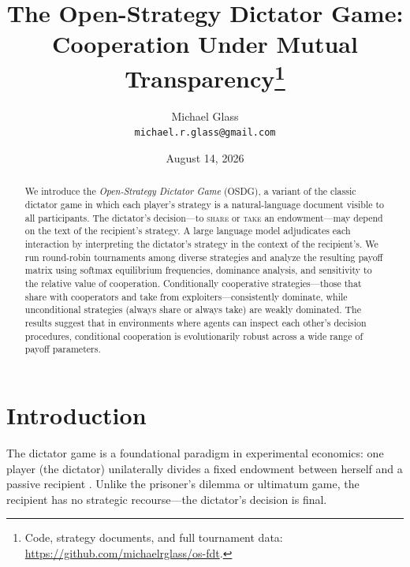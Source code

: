 \documentclass[11pt]{article}
\title{The Open-Strategy Dictator Game:\\
  Cooperation Under Mutual Transparency\thanks{Code, strategy
  documents, and full tournament data:
  \url{https://github.com/michaelrglass/os-fdt}.}}
\author{
  Michael Glass \\
  \texttt{michael.r.glass@gmail.com}
}
\date{August 14, 2026}
\begin{document}
\maketitle

\begin{abstract}
We introduce the \emph{Open-Strategy Dictator Game} (OSDG), a variant of the
classic dictator game in which each player's strategy is a natural-language
document visible to all participants.  The dictator's decision---to \textup{\textsc{share}} or
\textup{\textsc{take}} an endowment---may depend on the text of the recipient's strategy.
A large language model adjudicates each interaction by interpreting the
dictator's strategy in the context of the recipient's.  We run round-robin
tournaments among diverse strategies and analyze the resulting payoff matrix
using softmax equilibrium frequencies, dominance analysis, and sensitivity
to the relative value of cooperation.
Conditionally cooperative strategies---those that share with cooperators
and take from exploiters---consistently dominate, while unconditional
strategies (always share or always take) are weakly dominated.
The results suggest that in environments where agents can inspect each
other's decision procedures, conditional cooperation is
evolutionarily robust across a wide range of payoff parameters.
\end{abstract}


\section{Introduction}
\label{sec:intro}

The dictator game is a foundational paradigm in experimental economics:
one player (the dictator) unilaterally divides a fixed endowment between
herself and a passive recipient \citep{kahneman1986fairness}.
Unlike the prisoner's dilemma or ultimatum game, the recipient has no
strategic recourse---the dictator's decision is final.

\end{document}
